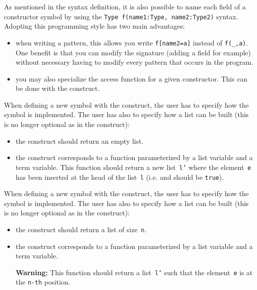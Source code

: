 \noindent
As mentioned in the syntax definition, it is also possible to name
each field of a constructor symbol by using the
\texttt{Type f(name1:Type, name2:Type2)} syntax.  
Adopting this programming style has two main advantages:
\begin{itemize}
\item when writing a pattern, this allows you write \texttt{f[name2=a]}
  instead of \texttt{f(\_,a)}. One benefit is that you can modify the
  signature (adding a field for example) without necessary having to
  modify every pattern that occurs in the program.

\item\label{getslot} you may also specialize the  access
function for a given constructor. This can be done with the
 construct.
\end{itemize}


\smallskip\noindent\label{oplistdef}
When defining a new symbol with the  construct,
the user has to specify how the symbol is implemented. 
The user has also to specify how a list can be built (this is no
longer optional as in the  construct):
\begin{itemize}
\item\label{emptylist} the  construct should return an empty
  list.

\item\label{insert} the  construct corresponds to a function
  parameterized by a list variable and a term variable. This function
  should return a new list~\texttt{l'} where the element~\texttt{e}
  has been inserted at the head of the list~\texttt{l}
  (i.e.  and
   should be \texttt{true}).
\end{itemize}

\noindent\label{oparraydef}
When defining a new symbol with the  construct,
the user has to specify how the symbol is implemented. 
The user has also to specify how a list can be built (this is no 
longer optional as in the  construct):
\begin{itemize}
\item\label{emptyarray} the  construct should return a list of
  size~\texttt{n}.  

\item\label{append} the  construct corresponds to a
  function parameterized by a list variable and a term variable. 

\textbf{Warning: }
This function should return a list~\texttt{l'} such that
  the element~\texttt{e} is at the \texttt{n-th} position.
\end{itemize}

